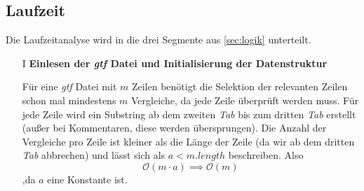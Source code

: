 \documentclass[12pt]{article}
\begin{document}
\subsection{Laufzeit}
Die Laufzeitanalyse wird in die drei Segmente aus \ref{sec:logik} unterteilt.
\begin{enumerate}
    \item[I] \textbf{Einlesen der \textit{gtf} Datei und Initialisierung der Datenstruktur}

        Für eine \textit{gtf} Datei mit $m$ Zeilen benötigt die Selektion der relevanten Zeilen
        schon mal mindestens $m$ Vergleiche, da jede Zeile überprüft werden muss.
        Für jede Zeile wird ein Substring ab dem zweiten \textit{Tab} bis zum dritten \textit{Tab} erstellt (au\ss er bei Kommentaren, diese werden übersprungen). 
        Die Anzahl der Vergleiche pro Zeile ist kleiner als die Länge der Zeile (da wir ab dem dritten \textit{Tab} abbrechen) und lässt 
        sich als $a < m.length$ beschreiben. Also
        \begin{equation}
            \mathcal{O}(m \cdot a) \implies \mathcal{O}(m)
        \end{equation}
        ,da $a$ eine Konstante ist.
        

\end{enumerate}
\end{document}
